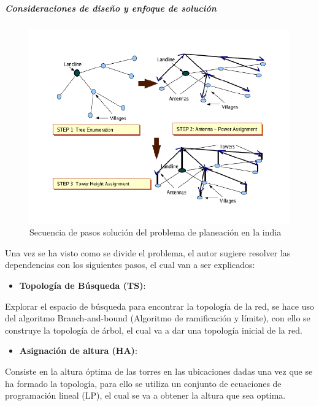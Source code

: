 \documentclass[]{article}
\providecommand{\tightlist}{%
  \setlength{\itemsep}{0pt}\setlength{\parskip}{0pt}}
\let\oldsubparagraph\subparagraph
\renewcommand{\subparagraph}[1]{\oldsubparagraph{#1}\mbox{}}
\begin{document}
\subparagraph{Consideraciones de diseño y enfoque de
solución}\label{consideraciones-de-diseuxf1o-y-enfoque-de-soluciuxf3n}

\begin{figure}
\centering
\includegraphics{sen.pdf}
\caption{Secuencia de pasos solución del problema de planeación en la
india}
\end{figure}

Una vez se ha visto como se divide el problema, el autor sugiere
resolver las dependencias con los siguientes pasos, el cual van a ser
explicados:

\begin{itemize}
\tightlist
\item
  \textbf{Topología de Búsqueda (TS)}:
\end{itemize}

Explorar el espacio de búsqueda para encontrar la topología de la red,
se hace uso del algoritmo Branch-and-bound (Algoritmo de ramificación y
límite), con ello se construye la topología de árbol, el cual va a dar
una topología inicial de la red.

\begin{itemize}
\tightlist
\item
  \textbf{Asignación de altura (HA)}:
\end{itemize}

Consiste en la altura óptima de las torres en las ubicaciones dadas una
vez que se ha formado la topología, para ello se utiliza un conjunto de
ecuaciones de programación lineal (LP), el cual se va a obtener la
altura que sea optima.
\end{document}
